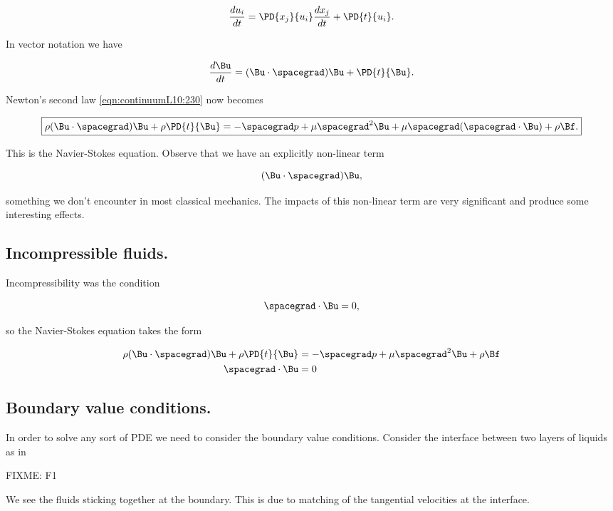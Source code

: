 \begin{equation}\label{eqn:continuumL10:270}
\frac{du_i}{dt} = \PD{x_j}{u_i} \frac{dx_j}{dt} + \PD{t}{u_i} .
\end{equation}

In vector notation we have

\begin{equation}\label{eqn:continuumL10:290}
\frac{d\Bu}{dt} = (\Bu \cdot \spacegrad) \Bu + \PD{t}{\Bu}.
\end{equation}

Newton's second law \ref{eqn:continuumL10:230} now becomes

\begin{equation}\label{eqn:continuumL10:230b}
\boxed{
\rho 
 (\Bu \cdot \spacegrad) \Bu + \rho \PD{t}{\Bu} 
= -\spacegrad p + \mu \spacegrad^2 \Bu 
+ \mu \spacegrad (\spacegrad \cdot \Bu) + \rho \Bf.
}
\end{equation}

This is the Navier-Stokes equation.  Observe that we have an explicitly non-linear term

\begin{equation}\label{eqn:continuumL10:310}
(\Bu \cdot \spacegrad) \Bu ,
\end{equation}

something we don't encounter in most classical mechanics.  The impacts of this non-linear term are very significant and produce some interesting effects.

\subsection{Incompressible fluids.}

Incompressibility was the condition

\begin{equation}\label{eqn:continuumL10:330}
\spacegrad \cdot \Bu = 0,
\end{equation}

so the Navier-Stokes equation takes the form

\begin{equation}\label{eqn:continuumL10:230b}
\begin{aligned}
\rho 
 (\Bu \cdot \spacegrad) \Bu + \rho \PD{t}{\Bu} 
&= -\spacegrad p + \mu \spacegrad^2 \Bu 
+ \rho \Bf \\
\spacegrad \cdot \Bu &= 0
\end{aligned}
\end{equation}

\subsection{Boundary value conditions.}

In order to solve any sort of PDE we need to consider the boundary value conditions.  Consider the interface between two layers of liquids as in 

FIXME: F1

We see the fluids sticking together at the boundary.  This is due to matching of the tangential velocities at the interface.


\EndArticle
